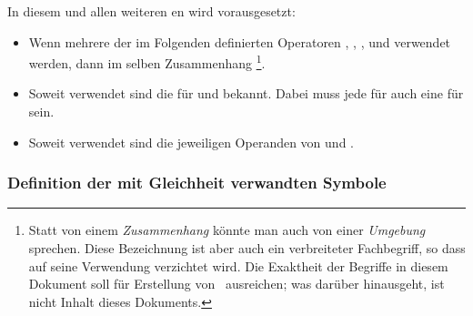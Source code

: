 In diesem und allen weiteren \sectionname{}en wird vorausgesetzt:
\begin{itemize}
	\item Wenn mehrere der im Folgenden definierten Operatoren \symqt{$\metadefeq$}, , \symqt{$=$}, \symqt{$\ne$} und \symqt{$\equiv$} verwendet werden, dann im selben Zusammenhang%
	\footnote{%
		Statt von einem \emph{Zusammenhang} könnte man auch von einer \emph{Umgebung} sprechen.
		Diese Bezeichnung ist aber auch ein verbreiteter Fachbegriff, so dass auf seine Verwendung verzichtet wird.
		Die Exaktheit der Begriffe in diesem Dokument soll für Erstellung von \ASBA\ ausreichen; was darüber hinausgeht, ist nicht Inhalt dieses Dokuments.%
	}.
	\item Soweit verwendet sind die \emph{} für \symqt{$=$} und \symqt{$\equiv$} bekannt.
	Dabei muss jede  für \symqt{$\equiv$} auch eine für \symqt{$=$} sein.
	\item Soweit verwendet sind die jeweiligen Operanden von \symqt{$=$} und \symqt{$\equiv$} .
\end{itemize}

\subsubsection{Definition der mit Gleichheit verwandten Symbole}
\label{subsub:DefinitionGleichheit}

